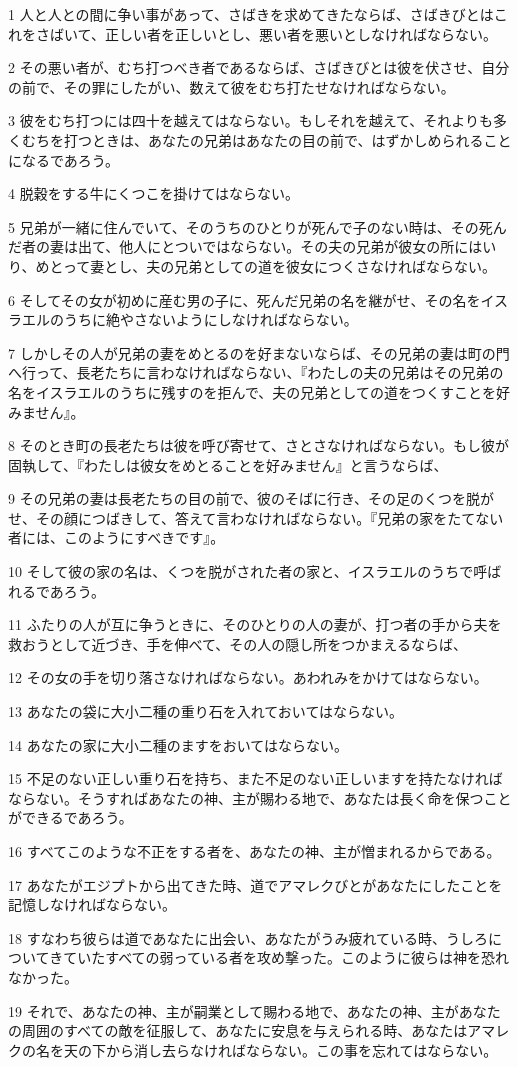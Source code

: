 \par 1 人と人との間に争い事があって、さばきを求めてきたならば、さばきびとはこれをさばいて、正しい者を正しいとし、悪い者を悪いとしなければならない。
\par 2 その悪い者が、むち打つべき者であるならば、さばきびとは彼を伏させ、自分の前で、その罪にしたがい、数えて彼をむち打たせなければならない。
\par 3 彼をむち打つには四十を越えてはならない。もしそれを越えて、それよりも多くむちを打つときは、あなたの兄弟はあなたの目の前で、はずかしめられることになるであろう。
\par 4 脱穀をする牛にくつこを掛けてはならない。
\par 5 兄弟が一緒に住んでいて、そのうちのひとりが死んで子のない時は、その死んだ者の妻は出て、他人にとついではならない。その夫の兄弟が彼女の所にはいり、めとって妻とし、夫の兄弟としての道を彼女につくさなければならない。
\par 6 そしてその女が初めに産む男の子に、死んだ兄弟の名を継がせ、その名をイスラエルのうちに絶やさないようにしなければならない。
\par 7 しかしその人が兄弟の妻をめとるのを好まないならば、その兄弟の妻は町の門へ行って、長老たちに言わなければならない、『わたしの夫の兄弟はその兄弟の名をイスラエルのうちに残すのを拒んで、夫の兄弟としての道をつくすことを好みません』。
\par 8 そのとき町の長老たちは彼を呼び寄せて、さとさなければならない。もし彼が固執して、『わたしは彼女をめとることを好みません』と言うならば、
\par 9 その兄弟の妻は長老たちの目の前で、彼のそばに行き、その足のくつを脱がせ、その顔につばきして、答えて言わなければならない。『兄弟の家をたてない者には、このようにすべきです』。
\par 10 そして彼の家の名は、くつを脱がされた者の家と、イスラエルのうちで呼ばれるであろう。
\par 11 ふたりの人が互に争うときに、そのひとりの人の妻が、打つ者の手から夫を救おうとして近づき、手を伸べて、その人の隠し所をつかまえるならば、
\par 12 その女の手を切り落さなければならない。あわれみをかけてはならない。
\par 13 あなたの袋に大小二種の重り石を入れておいてはならない。
\par 14 あなたの家に大小二種のますをおいてはならない。
\par 15 不足のない正しい重り石を持ち、また不足のない正しいますを持たなければならない。そうすればあなたの神、主が賜わる地で、あなたは長く命を保つことができるであろう。
\par 16 すべてこのような不正をする者を、あなたの神、主が憎まれるからである。
\par 17 あなたがエジプトから出てきた時、道でアマレクびとがあなたにしたことを記憶しなければならない。
\par 18 すなわち彼らは道であなたに出会い、あなたがうみ疲れている時、うしろについてきていたすべての弱っている者を攻め撃った。このように彼らは神を恐れなかった。
\par 19 それで、あなたの神、主が嗣業として賜わる地で、あなたの神、主があなたの周囲のすべての敵を征服して、あなたに安息を与えられる時、あなたはアマレクの名を天の下から消し去らなければならない。この事を忘れてはならない。

